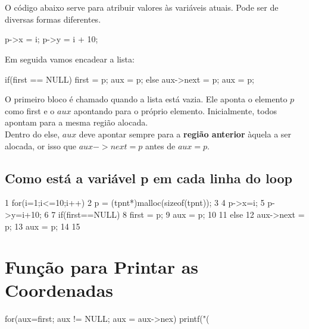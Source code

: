 \documentclass[ ]{article}
\begin{document}
	\\
	\\
	O código abaixo serve para atribuir valores às variáveis atuais. Pode ser de diversas formas diferentes.
	\begin{mylist}
		p->x = i;
		p->y = i + 10;
	\end{mylist}
	Em seguida vamos encadear a lista:
	\begin{mylist}
		if(first == NULL){
			first = p;
			aux = p;
		}
		else{
			aux->next = p;
			aux = p;
		}
	\end{mylist}
	O primeiro bloco é chamado quando a lista está vazia. Ele aponta o elemento $p$ como first e o $aux$ apontando para o próprio elemento. Inicialmente, todos apontam para a mesma região alocada.\\
	Dentro do else, $aux$ deve apontar sempre para a \textbf{região anterior} àquela a ser alocada, or isso que $aux->next = p$ antes de $aux = p$.\\
	\subsection{Como está a variável p em cada linha do loop}
	\begin{minipage}{8cm}
		\begin{mylist}
1 for(i=1;i<=10;i++){
2 	p = (tpnt*)malloc(sizeof(tpnt));
3		
4	p->x=i;
5	p->y=i+10;
6
7	if(first==NULL){
8		first = p;
9		aux = p;
10	}
11	else{
12		aux->next = p;
13		aux = p;
14	}
15 }
	
		\end{mylist}
	
	\end{minipage}
	
	
\section{Função para Printar as Coordenadas}
	\begin{mylist}
	for(aux=first; aux != NULL; aux = aux->nex){
		printf("(%
	}
	\end{mylist}
\end{document}
